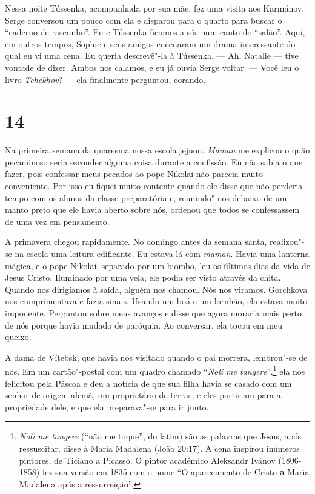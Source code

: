 Nessa noite Tússenka, acompanhada por sua mãe, fez uma visita aos
Karmánov. Serge conversou um pouco com ela e disparou para o quarto para
buscar o ``caderno de rascunho''. Eu e Tússenka ficamos a sós num canto
do ``salão''. Aqui, em outros tempos, Sophie e seus amigos encenaram um
drama interessante do qual eu vi uma cena. Eu queria descrevê"-la à
Tússenka. --- Ah, Natalie --- tive vontade de dizer. Ambos nos calamos,
e eu já ouvia Serge voltar. --- Você leu o livro \emph{Tchékhov}? --- ela
finalmente perguntou, corando.

\section{14}

Na primeira semana da quaresma nossa escola jejuou. \emph{Maman} me
explicou o quão pecaminoso seria esconder alguma coisa durante a
confissão. Eu não sabia o que fazer, pois confessar meus pecados ao pope
Nikolai não parecia muito conveniente. Por isso eu fiquei muito contente
quando ele disse que não perderia tempo com os alunos da classe
preparatória e, reunindo"-nos debaixo de um manto preto que ele havia
aberto sobre nós, ordenou que todos se confessassem de uma vez em
pensamento.

A primavera chegou rapidamente. No domingo antes da semana santa,
realizou"-se na escola uma leitura edificante. Eu estava lá com
\emph{maman}. Havia uma lanterna mágica, e o pope Nikolai, separado por
um biombo, leu os últimos dias da vida de Jesus Cristo. Iluminado por
uma vela, ele podia ser visto através da chita. Quando nos dirigíamos à
saída, alguém nos chamou. Nós nos viramos. Gorchkova nos cumprimentava e
fazia sinais. Usando um boá e um lornhão, ela estava muito imponente.
Perguntou sobre meus avanços e disse que agora moraria mais perto de nós
porque havia mudado de paróquia. Ao conversar, ela tocou em meu queixo.

A dama de Vítebsk, que havia nos visitado quando o pai morrera,
lembrou"-se de nós. Em um cartão"-postal com um quadro chamado
``\emph{Noli me tangere}'',\footnote{\emph{Noli me tangere} (``não me
  toque'', do latim) são as palavras que Jesus, após ressuscitar, disse
  à Maria Madalena (João 20:17). A cena inspirou inúmeros pintores, de
  Ticiano a Picasso. O pintor acadêmico Aleksandr Ivánov (1806-1858) fez
  sua versão em 1835 com o nome ``O aparecimento de Cristo \textbf{a}
  Maria Madalena após a ressurreição''.} ela nos felicitou pela Páscoa e
deu a notícia de que sua filha havia se casado com um senhor de origem
alemã, um proprietário de terras, e eles partiriam para a propriedade
dele, e que ela preparava"-se para ir junto.

